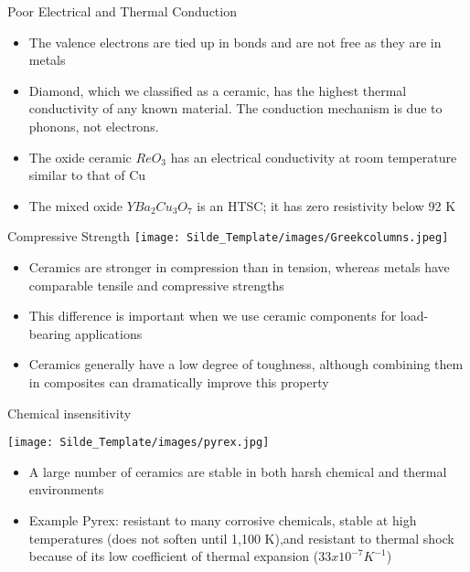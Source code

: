 \documentclass{libs/XJTLU_format}
\begin{document}
\begin{frame}{Poor Electrical and Thermal Conduction}
    
    \begin{itemize}
        \item The valence electrons are tied up in bonds and are not free as they are in metals
        \pause
        \item Diamond, which we classified as a ceramic, has the highest thermal conductivity of any known material. \pause The conduction mechanism is due to phonons, not electrons.
        \pause
        \item The oxide ceramic $ReO_{3}$ has an electrical conductivity at room temperature similar to that of Cu
        \pause
        \item The mixed oxide $YBa_{2}Cu_{3}O_{7}$ is an HTSC; it has zero resistivity below 92 K
    \end{itemize}
    
\end{frame}

\begin{frame}{Compressive Strength}
    \centering
    \texttt{[image: Silde\_Template/images/Greekcolumns.jpeg]}
    
    \begin{itemize}
        \item Ceramics are stronger in compression than in tension, whereas metals have comparable tensile and compressive strengths \pause
        \item This difference is important when we use ceramic components for load-bearing applications \pause
        \item Ceramics generally have a low degree of toughness, although combining them in composites can dramatically improve this property
    \end{itemize}
\end{frame}

\begin{frame}{Chemical insensitivity}

\centering
\texttt{[image: Silde\_Template/images/pyrex.jpg]}

\begin{itemize}
    \item A large number of ceramics are stable in both harsh chemical and thermal environments
    \pause
    \item Example Pyrex: resistant to many corrosive chemicals, \pause stable at high temperatures (does not soften until 1,100 K),\pause  and resistant to thermal shock because of its low coefficient of thermal expansion ($33x10^{-7} K^{-1}$)
\end{itemize}
    
\end{frame}
\end{document}
